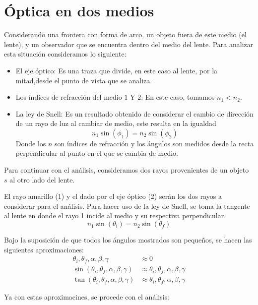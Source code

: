 \section{Óptica en dos medios}

Considerando una frontera con forma de arco, un objeto fuera de este
medio (el lente), y un observador que se encuentra dentro del medio del
lente. Para analizar esta situación consideramos lo siguiente:
\begin{itemize}
    \item El eje óptico:
    Es una traza que divide, en este caso al lente, por la mitad,desde
    el punto de vista que se analiza.
    \item Los índices de refracción del medio $1$ Y $2$:
    En este caso, tomamos $n_1 < n_2$.
    \item La ley de Snell:
    Es un resultado obtenido de considerar el cambio de dirección de
    un rayo de luz al cambiar de medio, este resulta en la igualdad
    \[n_1 \sin(\phi_1) = n_2 \sin(\phi_2)\]
    Donde los $n$ son índices de refracción y los ángulos son medidos
    desde la recta perpendicular al punto en el que se cambia de medio.
\end{itemize}

Para continuar con el análisis, consideramos dos rayos provenientes de
un objeto $s$ al otro lado del lente.



El rayo amarillo (1) y el dado por el eje óptico (2) serán los dos rayos a
considerar para el análisis. Para hacer uso de la ley de Snell, se toma
la tangente al lente en donde el rayo 1 incide al medio y su respectiva
perpendicular.
\[n_1 \sin(\theta_i) = n_2 \sin(\theta_f)\]

Bajo la suposición de que todos los ángulos mostrados son pequeños, se
hacen las siguientes aproximaciones:
\begin{align*}
    \theta_i,\theta_f,\alpha, \beta, \gamma &\approx 0\\
    \sin(\theta_i,\theta_f,\alpha, \beta, \gamma) 
        &\approx \theta_i,\theta_f,\alpha, \beta, \gamma\\
    \tan(\theta_i,\theta_f,\alpha, \beta, \gamma)
        &\approx \theta_i,\theta_f,\alpha, \beta, \gamma
\end{align*}

Ya con estas aproximacines, se procede con el análisis:

